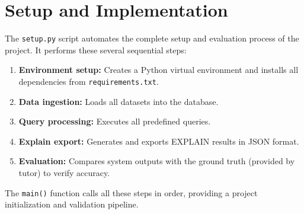 \documentclass[11pt,a4paper]{article}
\begin{document}
\section{Setup and Implementation}
The \texttt{setup.py} script automates the complete setup and evaluation process of the project. 
It performs these several sequential steps:

\begin{enumerate}
    \item \textbf{Environment setup:} Creates a Python virtual environment and installs all dependencies from \texttt{requirements.txt}.
    \item \textbf{Data ingestion:} Loads all datasets into the database.
    \item \textbf{Query processing:} Executes all predefined queries.
    \item \textbf{Explain export:} Generates and exports EXPLAIN results in JSON format.
    \item \textbf{Evaluation:} Compares system outputs with the ground truth (provided by tutor) to verify accuracy.
\end{enumerate}

The \texttt{main()} function calls all these steps in order, providing a project initialization and validation pipeline.
\end{document}
